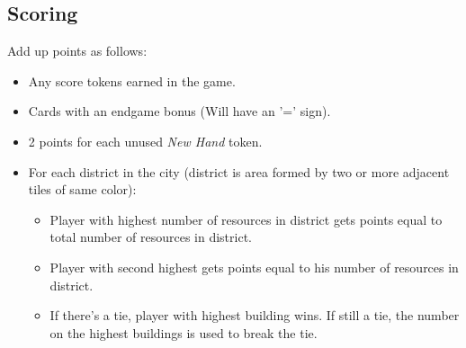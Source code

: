 \documentclass[12pt]{article}
\newenvironment{itemizeCustom}
{\begin{itemize}
  \setlength{\itemsep}{1pt}
  \setlength{\parskip}{0pt}
  \setlength{\parsep}{0pt}}
{\end{itemize}}
\begin{document}
\begin{multicols*}{2}
\section*{Scoring}
Add up points as follows:
\begin{itemizeCustom}
	\item Any score tokens earned in the game.
	\item Cards with an endgame bonus (Will have an '=' sign).
	\item 2 points for each unused \emph{New Hand} token.
	\item For each district in the city (district is area formed by two or more adjacent tiles of same color):
		\begin{itemizeCustom}
			\item Player with highest number of resources in district gets points equal to total number of resources in district.
			\item Player with second highest gets points equal to his number of resources in district.
			\item If there's a tie, player with highest building wins. If still a tie, the number on the highest buildings is used to break the tie.
		\end{itemizeCustom}
\end{itemizeCustom}

\end{multicols*}
\end{document}
